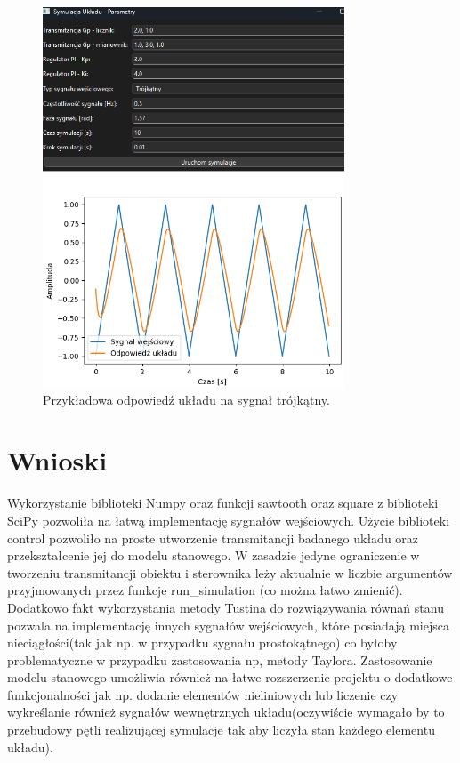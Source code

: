 \documentclass[12pt,a4paper]{article}
\begin{document}
\begin{figure}[h!]
    \centering
    \includegraphics[width=0.8\textwidth]{wykres5.png}
    \caption{Przykładowa odpowiedź układu na sygnał trójkątny.}
\end{figure}

\section{Wnioski}
Wykorzystanie biblioteki Numpy oraz funkcji sawtooth oraz square z biblioteki SciPy pozwoliła na łatwą implementację sygnałów wejściowych.
Użycie biblioteki control pozwoliło na proste utworzenie transmitancji badanego układu oraz przekształcenie jej do modelu stanowego. W zasadzie jedyne ograniczenie w tworzeniu transmitancji obiektu i sterownika leży aktualnie w liczbie argumentów przyjmowanych przez funkcje run\_simulation (co można łatwo zmienić).
Dodatkowo fakt wykorzystania metody Tustina do rozwiązywania równań stanu pozwala na implementację innych sygnałów wejściowych, które posiadają miejsca nieciągłości(tak jak np. w przypadku sygnału prostokątnego) co byłoby problematyczne w przypadku zastosowania np, metody Taylora.
Zastosowanie modelu stanowego umożliwia również na łatwe rozszerzenie projektu o dodatkowe funkcjonalności jak np. dodanie elementów nieliniowych lub liczenie czy wykreślanie również sygnałów wewnętrznych układu(oczywiście wymagało by to przebudowy pętli realizującej symulacje tak aby liczyła stan każdego elementu układu).   
\end{document}
